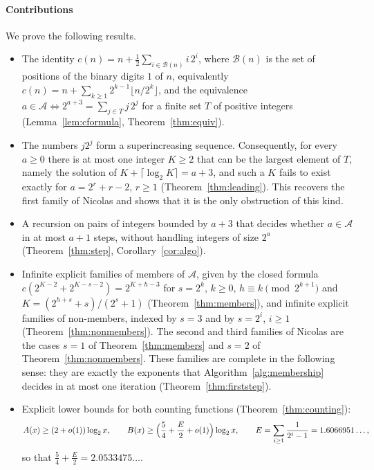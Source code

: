 \documentclass[11pt]{amsart}
\theoremstyle{definition}
\begin{document}
\paragraph{Contributions} We prove the following results.
\begin{itemize}
\item The identity $c(n)=n+\frac12\sum_{i\in\mathcal{B}(n)}i\,2^{i}$, where $\mathcal{B}(n)$ is the set of positions of the binary digits $1$ of $n$, equivalently $c(n)=n+\sum_{k\ge1}2^{k-1}\lfloor n/2^k\rfloor$, and the equivalence $a\in\mathcal{A}\iff 2^{a+3}=\sum_{j\in T}j\,2^{j}$ for a finite set $T$ of positive integers (Lemma~\ref{lem:cformula}, Theorem~\ref{thm:equiv}).
\item The numbers $j2^j$ form a superincreasing sequence. Consequently, for every $a\ge0$ there is at most one integer $K\ge2$ that can be the largest element of $T$, namely the solution of $K+\lceil\log_2K\rceil=a+3$, and such a $K$ fails to exist exactly for $a=2^r+r-2$, $r\ge1$ (Theorem~\ref{thm:leading}). This recovers the first family of Nicolas and shows that it is the only obstruction of this kind.
\item A recursion on pairs of integers bounded by $a+3$ that decides whether $a\in\mathcal{A}$ in at most $a+1$ steps, without handling integers of size $2^a$ (Theorem~\ref{thm:step}, Corollary~\ref{cor:algo}).
\item Infinite explicit families of members of $\mathcal{A}$, given by the closed formula $c(2^{K-2}+2^{K-s-2})=2^{K+h-3}$ for $s=2^k$, $k\ge0$, $h\equiv k\pmod{2^{k+1}}$ and $K=(2^{h+s}+s)/(2^s+1)$ (Theorem~\ref{thm:members}), and infinite explicit families of non-members, indexed by $s=3$ and by $s=2^i$, $i\ge1$ (Theorem~\ref{thm:nonmembers}). The second and third families of Nicolas are the cases $s=1$ of Theorem~\ref{thm:members} and $s=2$ of Theorem~\ref{thm:nonmembers}. These families are complete in the following sense: they are exactly the exponents that Algorithm~\ref{alg:membership} decides in at most one iteration (Theorem~\ref{thm:firststep}).
\item Explicit lower bounds for both counting functions (Theorem~\ref{thm:counting}):
\[
A(x)\ge(2+o(1))\log_2x,\qquad B(x)\ge\Bigl(\frac54+\frac{E}{2}+o(1)\Bigr)\log_2x,\qquad E=\sum_{i\ge1}\frac{1}{2^i-1}=1.6066951\ldots,
\]
so that $\frac54+\frac E2=2.0533475\ldots$.

\end{itemize}
\end{document}
